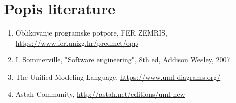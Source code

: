 \chapter*{Popis literature}
	 	
 
		
		\begin{enumerate}
			
			
			\item  Oblikovanje programske potpore, FER ZEMRIS, \url{https://www.fer.unizg.hr/predmet/opp}
			
			\item  I. Sommerville, "Software engineering", 8th ed, Addison Wesley, 2007.
			
			\item  The Unified Modeling Language, \url{https://www.uml-diagrams.org/}
			
			\item  Astah Community, \url{http://astah.net/editions/uml-new}
		\end{enumerate}
		
		 